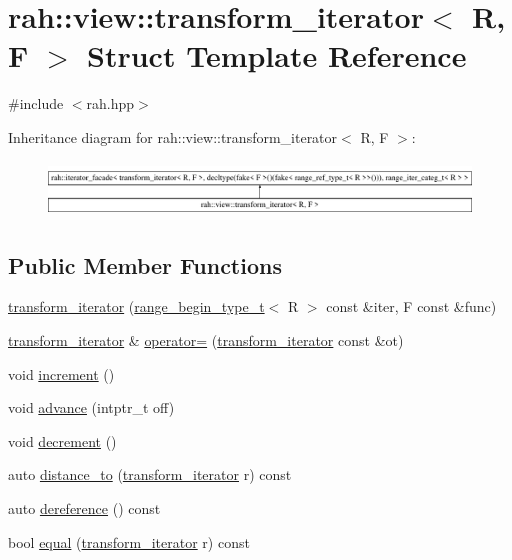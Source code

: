 \hypertarget{structrah_1_1view_1_1transform__iterator}{}\section{rah\+::view\+::transform\+\_\+iterator$<$ R, F $>$ Struct Template Reference}
\label{structrah_1_1view_1_1transform__iterator}


{\ttfamily \#include $<$rah.\+hpp$>$}

Inheritance diagram for rah\+::view\+::transform\+\_\+iterator$<$ R, F $>$\+:\begin{figure}[H]
\begin{center}
\leavevmode
\includegraphics[height=1.458333cm]{structrah_1_1view_1_1transform__iterator}
\end{center}
\end{figure}
\subsection*{Public Member Functions}
\begin{DoxyCompactItemize}
\item 
\mbox{\hyperlink{structrah_1_1view_1_1transform__iterator_ae8f127be961b14896c87d94e710a9a1a}{transform\+\_\+iterator}} (\mbox{\hyperlink{namespacerah_a28aff4eeddcece6be65ff0b956d32d4a}{range\+\_\+begin\+\_\+type\+\_\+t}}$<$ R $>$ const \&iter, F const \&func)
\item 
\mbox{\hyperlink{structrah_1_1view_1_1transform__iterator}{transform\+\_\+iterator}} \& \mbox{\hyperlink{structrah_1_1view_1_1transform__iterator_a4589b5fff7d8505b8a569c9d1f863929}{operator=}} (\mbox{\hyperlink{structrah_1_1view_1_1transform__iterator}{transform\+\_\+iterator}} const \&ot)
\item 
void \mbox{\hyperlink{structrah_1_1view_1_1transform__iterator_a1ee5c30f733b63b1cd26baa121389dd1}{increment}} ()
\item 
void \mbox{\hyperlink{structrah_1_1view_1_1transform__iterator_a56c602664659b11bfca3da418c6977be}{advance}} (intptr\+\_\+t off)
\item 
void \mbox{\hyperlink{structrah_1_1view_1_1transform__iterator_a05c99213d071102e793d57b967f7880d}{decrement}} ()
\item 
auto \mbox{\hyperlink{structrah_1_1view_1_1transform__iterator_ae0919c95985ebca42017346da790c981}{distance\+\_\+to}} (\mbox{\hyperlink{structrah_1_1view_1_1transform__iterator}{transform\+\_\+iterator}} r) const
\item 
auto \mbox{\hyperlink{structrah_1_1view_1_1transform__iterator_af72f5246736a89feca39293123a999e2}{dereference}} () const
\item 
bool \mbox{\hyperlink{structrah_1_1view_1_1transform__iterator_a68105373ae5ce99863589e17605f3833}{equal}} (\mbox{\hyperlink{structrah_1_1view_1_1transform__iterator}{transform\+\_\+iterator}} r) const
\end{DoxyCompactItemize}
